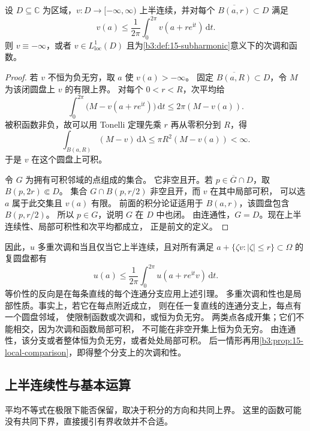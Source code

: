 \begin{lemma}[扩展次平均判据]\label{b3:lem:29-extended-submean}
设 \(D\subseteq\mathbb C\) 为区域，\(v:D\to[-\infty,\infty)\)
上半连续，并对每个 \(\overline{B(a,r)}\subset D\) 满足
\[
 v(a)\le\frac1{2\pi}\int_0^{2\pi}v(a+re^{\mathrm it})\,\mathrm dt.
\]
则 \(v\equiv-\infty\)，或者 \(v\in L^1_{\mathrm{loc}}(D)\)
且为\cref{b3:def:15-subharmonic}意义下的次调和函数。
\end{lemma}
\begin{proof}
若 \(v\) 不恒为负无穷，取 \(a\) 使 \(v(a)>-\infty\)。
固定 \(\overline{B(a,R)}\subset D\)，令 \(M\) 为该闭圆盘上 \(v\) 的有限上界。
对每个 \(0<r<R\)，次平均给
\[
 \int_0^{2\pi}\bigl(M-v(a+re^{\mathrm it})\bigr)\,\mathrm dt
 \le2\pi(M-v(a)).
\]
被积函数非负，故可以用 Tonelli 定理先乘 \(r\) 再从零积分到 \(R\)，得
\[
 \int_{B(a,R)}(M-v)\,\mathrm d\lambda\le\pi R^2(M-v(a))<\infty.
\]
于是 \(v\) 在这个圆盘上可积。

令 \(G\) 为拥有可积邻域的点组成的集合。
它非空且开。若 \(p\in\overline G\cap D\)，取 \(B(p,2r)\Subset D\)。
集合 \(G\cap B(p,r/2)\) 非空且开，而 \(v\) 在其中局部可积，
可以选 \(a\) 属于此交集且 \(v(a)\) 有限。
前面的积分论证适用于 \(B(a,r)\)，该圆盘包含 \(B(p,r/2)\)。
所以 \(p\in G\)，说明 \(G\) 在 \(D\) 中也闭。
由连通性，\(G=D\)。现在上半连续性、局部可积性和次平均都成立，
正是前文的定义。
\end{proof}

因此，\(u\) 多重次调和当且仅当它上半连续，且对所有满足
\(a+\{\zeta v:|\zeta|\le r\}\subset\Omega\) 的复圆盘都有
\begin{equation}\label{b3:eq:29-complex-submean}
 u(a)\le\frac1{2\pi}\int_0^{2\pi}u(a+re^{\mathrm it}v)\,\mathrm dt.
\end{equation}
等价性的反向是在每条直线的每个连通分支应用上述引理。
多重次调和性也是局部性质。事实上，若它在每点附近成立，
则在任一复直线的连通分支上，每点有一个圆盘邻域，
使限制函数或次调和，或恒为负无穷。
两类点各成开集；它们不能相交，因为次调和函数局部可积，
不可能在非空开集上恒为负无穷。
由连通性，该分支或者整体恒为负无穷，或者处处局部可积。
后一情形再用\cref{b3:prop:15-local-comparison}，即得整个分支上的次调和性。

\subsection{上半连续性与基本运算}
\label{b3:subsec:290302}

平均不等式在极限下能否保留，取决于积分的方向和共同上界。
这里的函数可能没有共同下界，直接援引有界收敛并不合适。

